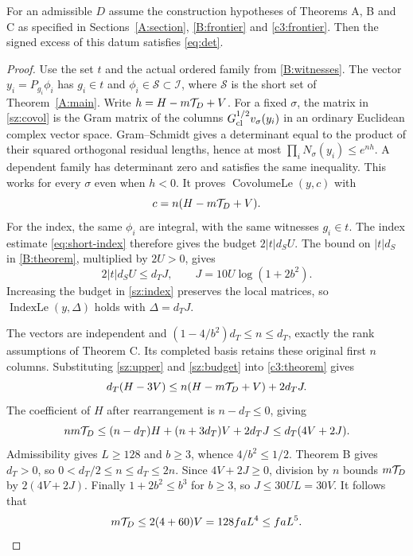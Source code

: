 \begin{chatAtheorem}\label{sz:conclusion}
For an admissible $D$ assume the construction hypotheses of
Theorems A, B and C as specified in
Sections~\ref{A:section}, \ref{B:frontier} and \ref{c3:frontier}.
Then the signed excess of this datum satisfies \eqref{eq:det}.
\end{chatAtheorem}
\begin{proof}
Use the set $t$ and the actual ordered family from \eqref{B:witnesses}.
The vector $y_i=P_{g_i}\phi_i$ has $g_i\in t$ and
$\phi_i\in\mathcal S\subset\mathcal I$, where $\mathcal S$ is the short
set of Theorem~\ref{A:main}. Write $h=H-m\mathcal T_D+V$.
For a fixed $\sigma$, the matrix in \eqref{sz:covol} is the Gram matrix of
the columns $G_{\rm cl}^{1/2}v_\sigma(y_i)$ in an ordinary Euclidean
complex vector space. Gram--Schmidt gives a determinant equal to the
product of their squared orthogonal residual lengths, hence at most
$\prod_i N_\sigma(y_i)\le e^{nh}$. A dependent family has determinant
zero and satisfies the same inequality. This works for every $\sigma$
even when $h<0$. It proves $\operatorname{CovolumeLe}(y,c)$ with
\begin{equation}\label{sz:upper}
 c=n(H-m\mathcal T_D+V).
\end{equation}
For the index, the same $\phi_i$ are integral, with the same witnesses
$g_i\in t$. The index estimate \eqref{eq:short-index} therefore gives the budget $2|t|d_SU$.
The bound on $|t|d_S$ in \eqref{B:theorem}, multiplied by $2U>0$, gives
\begin{equation}\label{sz:budget}
 2|t|d_SU\le d_TJ,\qquad J=10U\log(1+2b^2).
\end{equation}
Increasing the budget in \eqref{sz:index} preserves the local matrices,
so $\operatorname{IndexLe}(y,\Delta)$ holds with $\Delta=d_TJ$.

The vectors are independent and $(1-4/b^2)d_T\le n\le d_T$, exactly
the rank assumptions of Theorem C. Its completed basis retains these
original first $n$ columns. Substituting \eqref{sz:upper} and
\eqref{sz:budget} into \eqref{c3:theorem} gives
\[
 d_T(H-3V)\le n(H-m\mathcal T_D+V)+2d_TJ.
\]
The coefficient of $H$ after rearrangement is $n-d_T\le0$, giving
\begin{equation}\label{sz:signed}
 nm\mathcal T_D\le(n-d_T)H+(n+3d_T)V+2d_TJ\le d_T(4V+2J).
\end{equation}
Admissibility gives $L\ge128$ and $b\ge3$, whence $4/b^2\le1/2$.
Theorem B gives $d_T>0$, so $0<d_T/2\le n\le d_T\le2n$.
Since $4V+2J\ge0$, division by $n$ bounds $m\mathcal T_D$ by $2(4V+2J)$.
Finally $1+2b^2\le b^3$ for $b\ge3$, so
$J\le30UL=30V$. It follows that
\[
 m\mathcal T_D\le2(4+60)V=128faL^4\le faL^5 .
\]
\end{proof}

